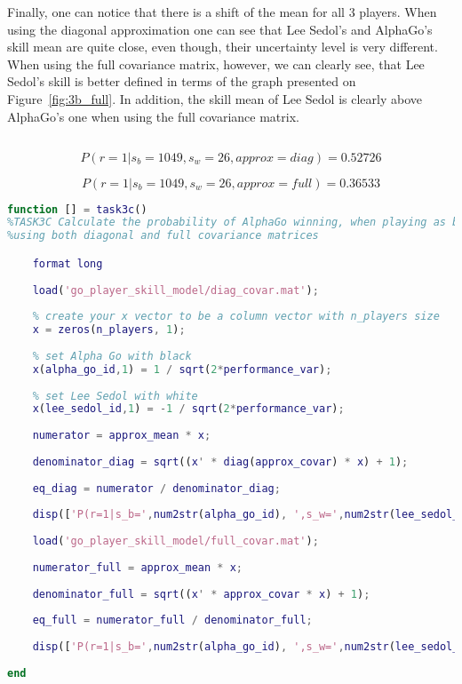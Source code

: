 \documentclass[a4paper,11pt]{article}
\theoremstyle{mytheor}
\begin{document}
Finally, one can notice that there is a shift of the mean for all 3 players. When using the diagonal approximation one can see that Lee Sedol's and AlphaGo's skill mean are quite close, even though, their uncertainty level is very different. When using the full covariance matrix, however, we can clearly see, that Lee Sedol's skill is better defined in terms of the graph presented on Figure~\ref{fig:3b_full}. In addition, the skill mean of Lee Sedol is clearly above AlphaGo's one when using the full covariance matrix.

\subsection{}

\begin{equation}
    P(r=1|s_b=1049,s_w=26,approx=diag)=0.52726
    \label{eq:ag_vs_ls_diag}
\end{equation}

\begin{equation}
    P(r=1|s_b=1049,s_w=26,approx=full)=0.36533
    \label{eq:ag_vs_ls_full}
\end{equation}

\begin{lstlisting}[label={list:3c},caption=Code for computing the probability of AlphaGo winning when playing black against Lee Sedol using both full and diagonal covariance matrices.,language=MATLAB]
function [] = task3c()
%TASK3C Calculate the probability of AlphaGo winning, when playing as black
%using both diagonal and full covariance matrices

    format long
    
    load('go_player_skill_model/diag_covar.mat');
    
    % create your x vector to be a column vector with n_players size
    x = zeros(n_players, 1);
    
    % set Alpha Go with black
    x(alpha_go_id,1) = 1 / sqrt(2*performance_var);
    
    % set Lee Sedol with white
    x(lee_sedol_id,1) = -1 / sqrt(2*performance_var);
    
    numerator = approx_mean * x;
    
    denominator_diag = sqrt((x' * diag(approx_covar) * x) + 1);
    
    eq_diag = numerator / denominator_diag;
    
    disp(['P(r=1|s_b=',num2str(alpha_go_id), ',s_w=',num2str(lee_sedol_id),',approx=diag)=',num2str(normcdf(eq_diag))]);
    
    load('go_player_skill_model/full_covar.mat');
    
    numerator_full = approx_mean * x;
    
    denominator_full = sqrt((x' * approx_covar * x) + 1);
    
    eq_full = numerator_full / denominator_full;
    
    disp(['P(r=1|s_b=',num2str(alpha_go_id), ',s_w=',num2str(lee_sedol_id),',approx=full)=',num2str(normcdf(eq_full))]);
    
end
\end{lstlisting}
\end{document}
